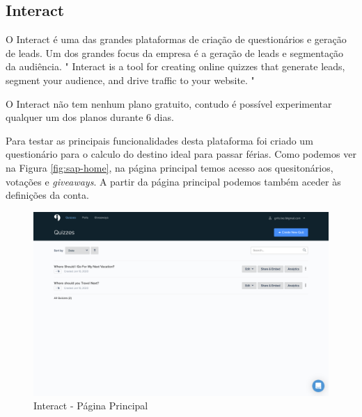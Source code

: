 \subsection{Interact}
\label{interact}

O Interact é uma das grandes plataformas de criação de questionários e geração de leads. Um dos grandes focus da empresa é a geração de leads e segmentação da audiência. " Interact is a tool for creating online quizzes that generate leads, segment your audience, and drive traffic to your website. "

O Interact não tem nenhum plano gratuito, contudo é possível experimentar qualquer um dos planos durante 6 dias. 

Para testar as principais funcionalidades desta plataforma foi criado um questionário para o calculo do destino ideal para passar férias. Como podemos ver na Figura \ref{fig:sap-home}, na página principal temos acesso aos quesitonários, votações e \textit{giveaways}. A partir da página principal podemos também aceder às definições da conta.

\newpage

\begin{figure}[ht!]
	\begin{center}
		\includegraphics[width=1\textwidth]{img/interact/home}
		\caption{Interact - Página Principal}
		\label{fig:interact-home}
	\end{center}
\end{figure}

